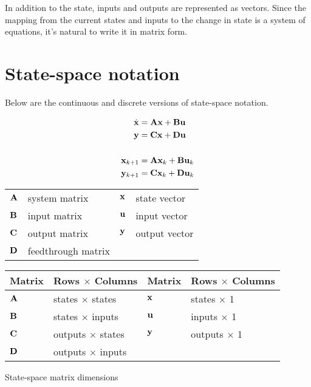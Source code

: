 In addition to the \gls{state}, inputs and outputs are represented as vectors.
Since the mapping from the current states and inputs to the change in state is a
system of equations, it's natural to write it in matrix form.

\section{State-space notation}

Below are the continuous and discrete versions of state-space notation.

\begin{definition}%
  \begin{align}
    \dot{\mathbf{x}} &= \mathbf{A}\mathbf{x} + \mathbf{B}\mathbf{u} \label{eq:ss_ctrl_x} \\
    \mathbf{y} &= \mathbf{C}\mathbf{x} + \mathbf{D}\mathbf{u} \label{eq:ss_ctrl_y} \\
    \nonumber \\
    \mathbf{x}_{k+1} &= \mathbf{A}\mathbf{x}_k + \mathbf{B}\mathbf{u}_k \label{eq:ssz_ctrl_x} \\
    \mathbf{y}_{k+1} &= \mathbf{C}\mathbf{x}_k + \mathbf{D}\mathbf{u}_k \label{eq:ssz_ctrl_y}
  \end{align}

  \begin{figurekey}
    \begin{tabulary}{\linewidth}{LLLL}
      $\mathbf{A}$ & system matrix      & $\mathbf{x}$ & state vector \\
      $\mathbf{B}$ & input matrix       & $\mathbf{u}$ & input vector \\
      $\mathbf{C}$ & output matrix      & $\mathbf{y}$ & output vector \\
      $\mathbf{D}$ & feedthrough matrix &  &  \\
    \end{tabulary}
  \end{figurekey}
\end{definition}

\begin{booktable}
  \begin{tabular}{|ll|ll|}
    \hline
    \rowcolor{headingbg}
    \textbf{Matrix} & \textbf{Rows $\times$ Columns} &
    \textbf{Matrix} & \textbf{Rows $\times$ Columns} \\
    \hline
    $\mathbf{A}$ & states $\times$ states & $\mathbf{x}$ & states $\times$ 1 \\
    $\mathbf{B}$ & states $\times$ inputs & $\mathbf{u}$ & inputs $\times$ 1 \\
    $\mathbf{C}$ & outputs $\times$ states & $\mathbf{y}$ & outputs $\times$ 1 \\
    $\mathbf{D}$ & outputs $\times$ inputs &  &  \\
    \hline
  \end{tabular}
  \caption{State-space matrix dimensions}
  \label{tab:ss_matrix_dims}
\end{booktable}

